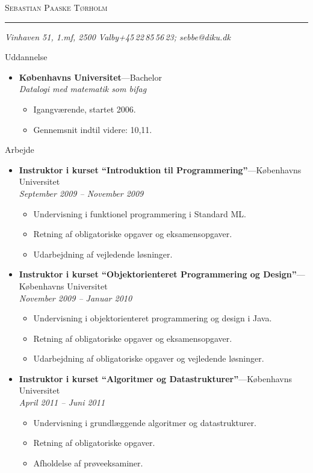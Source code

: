 \documentclass[11pt,oneside,a4paper]{article}
\makeatletter
\newcommand{\name}{Sebastian Paaske Tørholm}
\newcommand{\addr}{Vinhaven 51, 1.mf, 2500 Valby}
\newcommand{\phone}{+45\,22\,85\,56\,23}
\newcommand{\email}{sebbe@diku.dk}
\newcommand{\bigname}[1]{
	\begin{center}\fontfamily{phv}\selectfont\Huge\scshape#1\end{center}
}
\newenvironment{ressection}[1]{
	\vspace{4pt}
	{\fontfamily{phv}\selectfont\Large#1}
	\begin{itemize}
	\vspace{3pt}
}{
	\end{itemize}
}
\newcommand{\ressubitem}[1]{
	\vspace{-1pt}
	\item \begin{flushleft} #1 \end{flushleft}
}
\newcommand{\resbigitem}[3]{
	\vspace{-5pt}
	\item
	\textbf{#1}---#2 \\
	\textit{#3}
}
\newenvironment{ressubsec}[3]{
	\resbigitem{#1}{#2}{#3}
	\vspace{-2pt}
	\begin{itemize}
}{
	\end{itemize}
}
\makeatother
\begin{document}
 \selectfont

\bigname{\name}

\vspace{-8pt} \rule{\textwidth}{1pt}

\vspace{-1pt} {\small\itshape \addr \hfill \phone; \email}

\vspace{8 pt}




\begin{ressection}{Uddannelse}

	\begin{ressubsec}{Københavns Universitet}{Bachelor}{Datalogi med matematik som bifag}
		\ressubitem{Igangværende, startet 2006.}
		\ressubitem{Gennemsnit indtil videre: 10,11.}
	\end{ressubsec}

\end{ressection}


\begin{ressection}{Arbejde}
	\begin{ressubsec}{Instruktor i kurset ``Introduktion til Programmering''}{Københavns Universitet}{September 2009 -- November 2009}
		\ressubitem{Undervisning i funktionel programmering i Standard ML.}
		\ressubitem{Retning af obligatoriske opgaver og eksamensopgaver.}
		\ressubitem{Udarbejdning af vejledende løsninger.}
	\end{ressubsec}

	\begin{ressubsec}{Instruktor i kurset ``Objektorienteret Programmering og Design''}{Københavns Universitet}{November 2009 -- Januar 2010}
		\ressubitem{Undervisning i objektorienteret programmering og design i Java.}
		\ressubitem{Retning af obligatoriske opgaver og eksamensopgaver.}
		\ressubitem{Udarbejdning af obligatoriske opgaver og vejledende løsninger.}
	\end{ressubsec}
	
    \begin{ressubsec}{Instruktor i kurset ``Algoritmer og Datastrukturer''}{Københavns Universitet}{April 2011 -- Juni 2011}
		\ressubitem{Undervisning i grundlæggende algoritmer og datastrukturer.}
		\ressubitem{Retning af obligatoriske opgaver.}
		\ressubitem{Afholdelse af prøveeksaminer.}
	\end{ressubsec}


\end{ressection}
\end{document}
